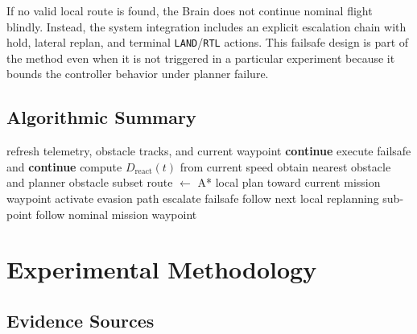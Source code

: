 \documentclass[a4paper,11pt]{article}
\begin{document}
If no valid local route is found, the Brain does not continue nominal flight blindly. Instead, the system integration includes an explicit escalation chain with hold, lateral replan, and terminal \texttt{LAND}/\texttt{RTL} actions. This failsafe design is part of the method even when it is not triggered in a particular experiment because it bounds the controller behavior under planner failure.

\subsection{Algorithmic Summary}

\begin{algorithm}[t]
    \caption{Simplified control loop for the proposed method integrated in Pipeline A}
    \label{alg:replanner}
    \small
    \begin{algorithmic}[1]
            \State refresh telemetry, obstacle tracks, and current waypoint
                \State \textbf{continue}
            \EndIf
                \State execute failsafe and \textbf{continue}
            \EndIf
            \State compute \(D_{\mathrm{react}}(t)\) from current speed
            \State obtain nearest obstacle and planner obstacle subset
                \State route \(\gets\) A* local plan toward current mission waypoint
                    \State activate evasion path
                \Else
                    \State escalate failsafe
                \EndIf
            \EndIf
                \State follow next local replanning sub-point
            \Else
                \State follow nominal mission waypoint
            \EndIf
        \EndWhile
    \end{algorithmic}
\end{algorithm}

\section{Experimental Methodology}

\subsection{Evidence Sources}
\end{document}
